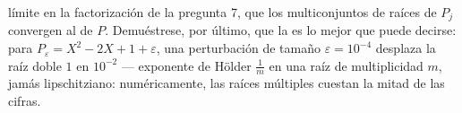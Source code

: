 \begin{problem}
\begin{enumerate}[resume]
        límite en la factorización de la pregunta 7, que los
        multiconjuntos de raíces de $P_j$ convergen al de $P$.
        Demuéstrese, por último, que la
         es lo mejor que
        puede decirse: para $P_\varepsilon = X^2 - 2X + 1 +
        \varepsilon$, una perturbación de tamaño $\varepsilon =
        10^{-4}$ desplaza la raíz doble $1$ en $10^{-2}$ --- exponente
        de Hölder $\frac1m$ en una raíz de multiplicidad $m$, jamás
        lipschitziano: numéricamente, las raíces múltiples cuestan la
        mitad de las cifras.
\end{enumerate}
\end{problem}

